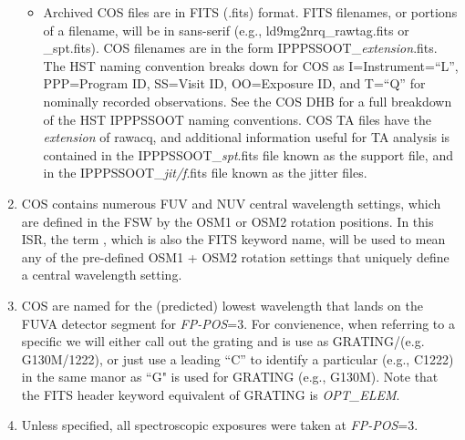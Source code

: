 \begin{enumerate}
{\begin{itemize}
{FSW patchable constants relating to mechanism positions begin with \textsc{pcmech\_} and will always be included in references.}
			\item{Archived COS files are in FITS (.fits) format. FITS filenames, or portions of a filename, will be in {\sf sans-serif} (e.g., {\sf ld9mg2nrq\_rawtag.fits} or {\sf \_spt.fits}).
			COS filenames are in the form {\sf IPPPSSOOT\_{\it extension}.fits}.
			The HST naming convention breaks down for COS as I=Instrument=``L'', PPP=Program ID, SS=Visit ID, OO=Exposure ID,
			and T=``Q'' for nominally recorded observations. See the COS DHB for a full breakdown of the HST IPPPSSOOT naming conventions.
			COS TA files have the {\it extension} of {\sf rawacq}, and additional
			information useful for TA analysis is contained in the {\sf IPPPSSOOT\_{\it spt}.fits} file known as the support file,
			and in the {\sf IPPPSSOOT\_{\it jit/f}.fits} file known as the jitter files.}
		\end{itemize}
	}
	\item{COS contains numerous FUV and NUV central wavelength settings, which are defined in the FSW by the OSM1 or OSM2 rotation positions.
	In this ISR, the term \cenwaveno, which is also the FITS keyword name, will be used to mean any of the pre-defined OSM1 + OSM2 rotation settings that uniquely define a central wavelength setting.}
	\item{COS \cenwaves are named for the (predicted) lowest wavelength that lands on the FUVA detector segment for \textit{FP-POS}=3. For convienence, when referring to
	a specific \cenwave we will either call out the grating and \cenwave is use as GRATING/\cenwave  (e.g. G130M/1222), or just use a leading ``C'' to identify a particular \cenwave (e.g., C1222) in the same manor as ``G" is used for GRATING (e.g., G130M).
	Note that the FITS header keyword equivalent of GRATING is \textit{OPT\_ELEM}.}
	\item{Unless specified, all spectroscopic exposures were taken at \textit{FP-POS}=3.}

\end{enumerate}
